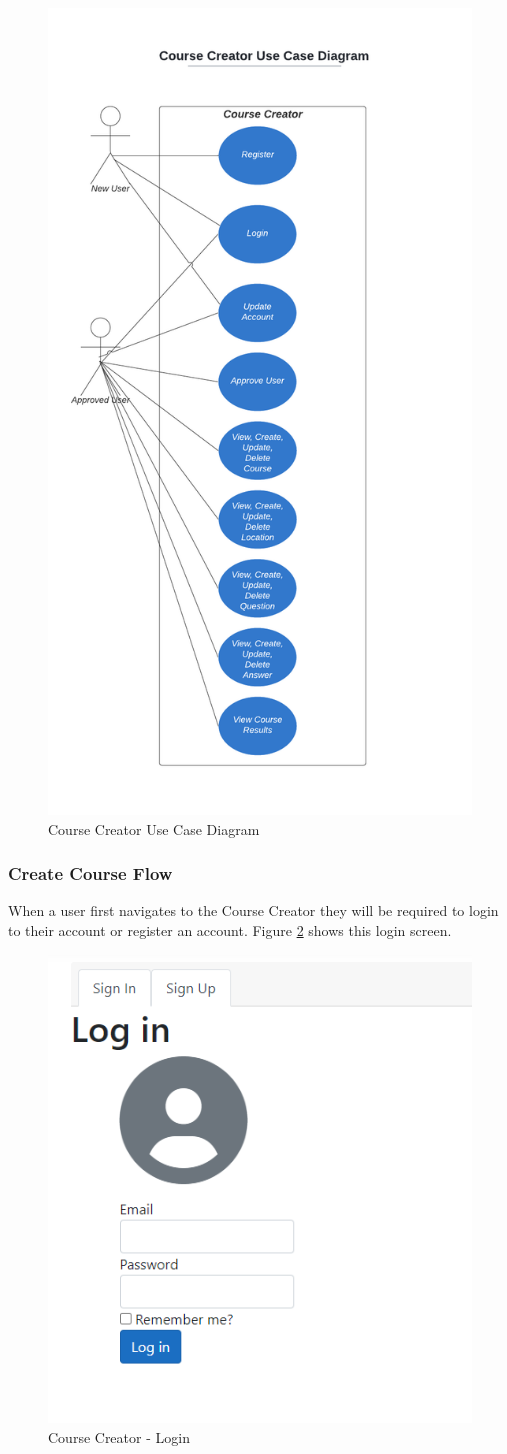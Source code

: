 \begin{figure}[htb]
	\centering
	\includegraphics[width=.5\textwidth]{Requirements/assets/course-creator-use-case-diagram.png}
	\caption[Course Creator Use Case Diagram]{\label{Course Creator Use Case Diagram}Course Creator Use Case Diagram}
\end{figure}

\subsubsection{Create Course Flow}
When a user first navigates to the Course Creator they will be required to login to their account or register an account. Figure \ref{Course Creator Login} shows this login screen.

\begin{figure}[htb]
	\centering
	\includegraphics[width=.5\textwidth]{Requirements/assets/cc-login.png}
	\caption[Course Creator - Login]{\label{Course Creator Login}Course Creator - Login}
\end{figure}

